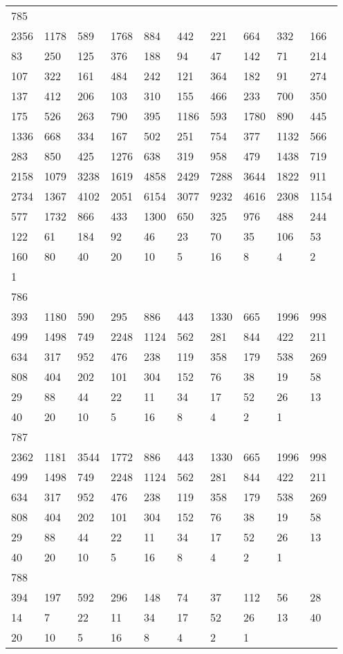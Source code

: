 \begin{longtable}{*{10}{l}}
785&&&&&&&&&\\
2356& 1178& 589& 1768& 884& 442& 221& 664& 332& 166\\
83& 250& 125& 376& 188& 94& 47& 142& 71& 214\\
107& 322& 161& 484& 242& 121& 364& 182& 91& 274\\
137& 412& 206& 103& 310& 155& 466& 233& 700& 350\\
175& 526& 263& 790& 395& 1186& 593& 1780& 890& 445\\
1336& 668& 334& 167& 502& 251& 754& 377& 1132& 566\\
283& 850& 425& 1276& 638& 319& 958& 479& 1438& 719\\
2158& 1079& 3238& 1619& 4858& 2429& 7288& 3644& 1822& 911\\
2734& 1367& 4102& 2051& 6154& 3077& 9232& 4616& 2308& 1154\\
577& 1732& 866& 433& 1300& 650& 325& 976& 488& 244\\
122& 61& 184& 92& 46& 23& 70& 35& 106& 53\\
160& 80& 40& 20& 10& 5& 16& 8& 4& 2\\
1& \\

786&&&&&&&&&\\
393& 1180& 590& 295& 886& 443& 1330& 665& 1996& 998\\
499& 1498& 749& 2248& 1124& 562& 281& 844& 422& 211\\
634& 317& 952& 476& 238& 119& 358& 179& 538& 269\\
808& 404& 202& 101& 304& 152& 76& 38& 19& 58\\
29& 88& 44& 22& 11& 34& 17& 52& 26& 13\\
40& 20& 10& 5& 16& 8& 4& 2& 1& \\

787&&&&&&&&&\\
2362& 1181& 3544& 1772& 886& 443& 1330& 665& 1996& 998\\
499& 1498& 749& 2248& 1124& 562& 281& 844& 422& 211\\
634& 317& 952& 476& 238& 119& 358& 179& 538& 269\\
808& 404& 202& 101& 304& 152& 76& 38& 19& 58\\
29& 88& 44& 22& 11& 34& 17& 52& 26& 13\\
40& 20& 10& 5& 16& 8& 4& 2& 1& \\

788&&&&&&&&&\\
394& 197& 592& 296& 148& 74& 37& 112& 56& 28\\
14& 7& 22& 11& 34& 17& 52& 26& 13& 40\\
20& 10& 5& 16& 8& 4& 2& 1& \\


\end{longtable}
